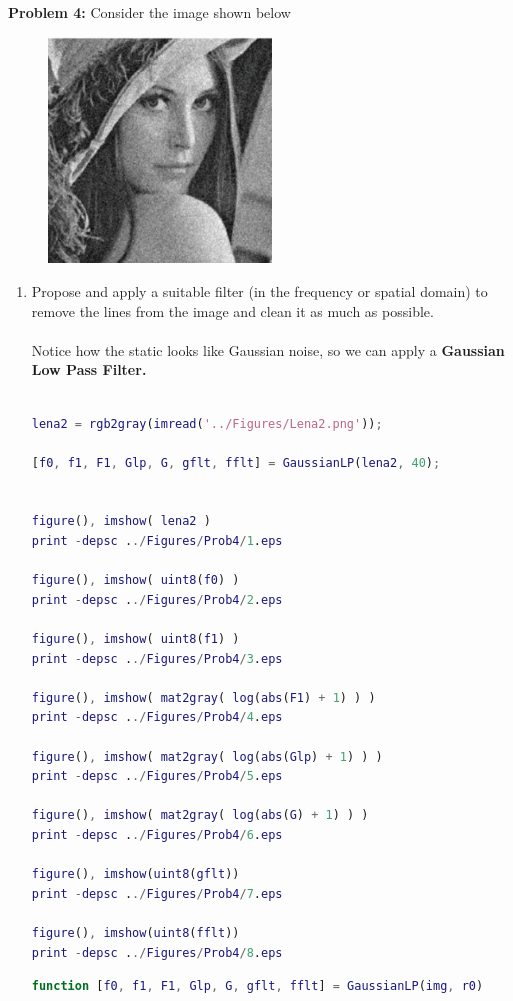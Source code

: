 \documentclass[11pt]{article}
\newenvironment{problem}[1]{\textbf{Problem #1: }}{\newpage}
\begin{document}
	\begin{problem}{4}
		Consider the image shown below
		\begin{figure}[h!]
			\centering
			\includegraphics[height = 6cm]{Figures/Lena2.png}
		\end{figure}
		\begin{enumerate}[label = (\alph*)]
			\item Propose and apply a suitable filter (in the frequency or spatial domain) to remove the lines from the image and clean it as much as possible.
			\\ \\
			Notice how the static looks like Gaussian noise, so we can apply a \textbf{Gaussian Low Pass Filter.}
			\\ \\
\begin{lstlisting}[language=Matlab]
lena2 = rgb2gray(imread('../Figures/Lena2.png'));

[f0, f1, F1, Glp, G, gflt, fflt] = GaussianLP(lena2, 40);


figure(), imshow( lena2 )
print -depsc ../Figures/Prob4/1.eps

figure(), imshow( uint8(f0) )
print -depsc ../Figures/Prob4/2.eps

figure(), imshow( uint8(f1) )
print -depsc ../Figures/Prob4/3.eps

figure(), imshow( mat2gray( log(abs(F1) + 1) ) )
print -depsc ../Figures/Prob4/4.eps

figure(), imshow( mat2gray( log(abs(Glp) + 1) ) )
print -depsc ../Figures/Prob4/5.eps

figure(), imshow( mat2gray( log(abs(G) + 1) ) )
print -depsc ../Figures/Prob4/6.eps

figure(), imshow(uint8(gflt))
print -depsc ../Figures/Prob4/7.eps

figure(), imshow(uint8(fflt))
print -depsc ../Figures/Prob4/8.eps
\end{lstlisting}
			\newpage
\begin{lstlisting}[language=Matlab]
function [f0, f1, F1, Glp, G, gflt, fflt] = GaussianLP(img, r0)


\end{lstlisting}
\end{enumerate}
\end{problem}
\end{document}
